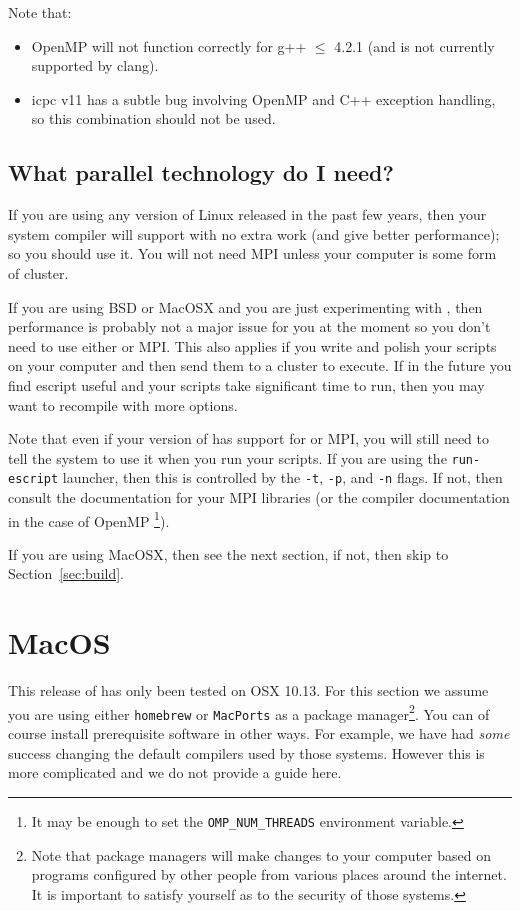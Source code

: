 Note that:
\begin{itemize}
 \item OpenMP will not function correctly for g++ $\leq$ 4.2.1 (and is not currently supported by clang).
 \item icpc v11 has a subtle bug involving OpenMP and C++ exception handling, so this combination should not be used.
\end{itemize}

\subsection{What parallel technology do I need?}\label{sec:needpar}
If you are using any version of Linux released in the past few years, then your system compiler will support
\openmp with no extra work (and give better performance); so you should use it.
You will not need MPI unless your computer is some form of cluster.

If you are using BSD or MacOSX and you are just experimenting with \escript, then performance is
probably not a major issue for you at the moment so you don't need to use either \openmp or MPI.
This also applies if you write and polish your scripts on your computer and then send them to a cluster to execute.
If in the future you find escript useful and your scripts take significant time to run, then you may want to recompile
\escript with more options.



Note that even if your version of \escript has support for \openmp or MPI, you will still need to tell the system to
use it when you run your scripts.
If you are using the \texttt{run-escript} launcher, then this is controlled by
the \texttt{-t}, \texttt{-p}, and \texttt{-n} flags.
If not, then consult the documentation for your MPI libraries (or the compiler documentation in the case of OpenMP
\footnote{It may be enough to set the \texttt{OMP\_NUM\_THREADS} environment variable.}).

If you are using MacOSX, then see the next section, if not, then skip to Section~\ref{sec:build}.

\section{MacOS}
This release of \escript has only been tested on OSX 10.13.
For this section we assume you are using either \texttt{homebrew} or \texttt{MacPorts} as a package
manager\footnote{Note that package managers will make changes to your computer based on programs configured by other people from
various places around the internet. It is important to satisfy yourself as to the security of those systems.}.
You can of course install prerequisite software in other ways.
For example, we have had \emph{some} success changing the default
compilers used by those systems. However this is more complicated and we do not provide a guide here.

